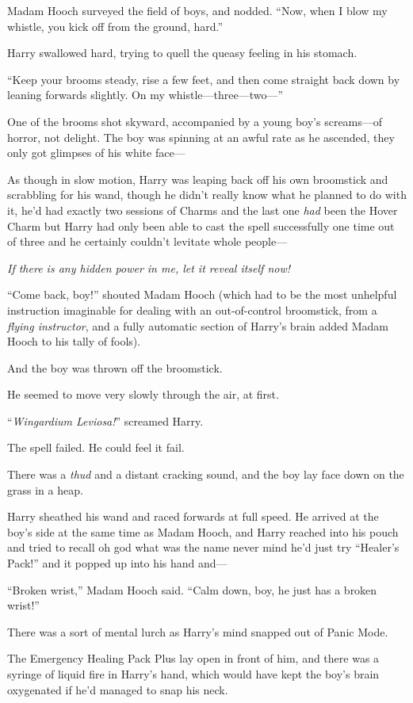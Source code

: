 Madam Hooch surveyed the field of boys, and nodded.
“Now, when I blow my whistle, you kick off from the ground, hard.”

Harry swallowed hard, trying to quell the queasy feeling in his stomach.

“Keep your brooms steady, rise a few feet, and then come straight back down by leaning forwards slightly. On my whistle—three—two—”

One of the brooms shot skyward, accompanied by a young boy’s screams—of horror, not delight. The boy was spinning at an awful rate as he ascended, they only got glimpses of his white face—

As though in slow motion, Harry was leaping back off his own broomstick and scrabbling for his wand, though he didn’t really know what he planned to do with it, he’d had exactly two sessions of Charms and the last one \emph{had} been the Hover Charm but Harry had only been able to cast the spell successfully one time out of three and he certainly couldn’t levitate whole people—

\emph{If there is any hidden power in me, let it reveal itself \emph{now}!}

“Come back, boy!” shouted Madam Hooch (which had to be the most unhelpful instruction imaginable for dealing with an out-of-control broomstick, from a \emph{flying instructor}, and a fully automatic section of Harry’s brain added Madam Hooch to his tally of fools).

And the boy was thrown off the broomstick.

He seemed to move very slowly through the air, at first.

“\emph{Wingardium Leviosa!}” screamed Harry.

The spell failed. He could feel it fail.

There was a \emph{thud} and a distant cracking sound, and the boy lay face down on the grass in a heap.

Harry sheathed his wand and raced forwards at full speed. He arrived at the boy’s side at the same time as Madam Hooch, and Harry reached into his pouch and tried to recall oh god what was the name never mind he’d just try
“Healer’s Pack!” and it popped up into his hand and—

“Broken wrist,” Madam Hooch said.
“Calm down, boy, he just has a broken wrist!”

There was a sort of mental lurch as Harry’s mind snapped out of Panic Mode.

The Emergency Healing Pack Plus lay open in front of him, and there was a syringe of liquid fire in Harry’s hand, which would have kept the boy’s brain oxygenated if he’d managed to snap his neck.

